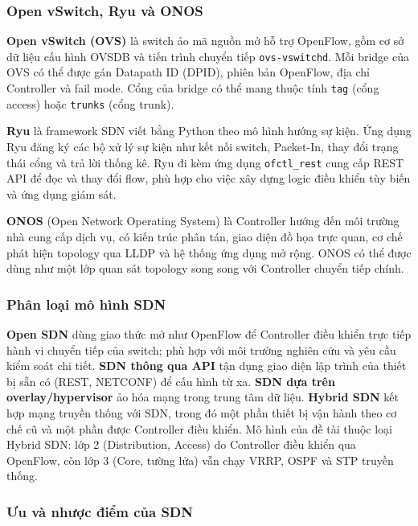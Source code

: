 \subsubsection{Open vSwitch, Ryu và ONOS}

\textbf{Open vSwitch (OVS)} là switch ảo mã nguồn mở hỗ trợ OpenFlow, gồm cơ sở dữ liệu cấu hình OVSDB và tiến trình chuyển tiếp \texttt{ovs-vswitchd}. Mỗi bridge của OVS có thể được gán Datapath ID (DPID), phiên bản OpenFlow, địa chỉ Controller và fail mode. Cổng của bridge có thể mang thuộc tính \texttt{tag} (cổng access) hoặc \texttt{trunks} (cổng trunk).

\textbf{Ryu} là framework SDN viết bằng Python theo mô hình hướng sự kiện. Ứng dụng Ryu đăng ký các bộ xử lý sự kiện như kết nối switch, Packet-In, thay đổi trạng thái cổng và trả lời thống kê. Ryu đi kèm ứng dụng \texttt{ofctl\_rest} cung cấp REST API để đọc và thay đổi flow, phù hợp cho việc xây dựng logic điều khiển tùy biến và ứng dụng giám sát.

\textbf{ONOS} (Open Network Operating System) là Controller hướng đến môi trường nhà cung cấp dịch vụ, có kiến trúc phân tán, giao diện đồ họa trực quan, cơ chế phát hiện topology qua LLDP và hệ thống ứng dụng mở rộng. ONOS có thể được dùng như một lớp quan sát topology song song với Controller chuyển tiếp chính.

\subsubsection{Phân loại mô hình SDN}

\textbf{Open SDN} dùng giao thức mở như OpenFlow để Controller điều khiển trực tiếp hành vi chuyển tiếp của switch; phù hợp với môi trường nghiên cứu và yêu cầu kiểm soát chi tiết. \textbf{SDN thông qua API} tận dụng giao diện lập trình của thiết bị sẵn có (REST, NETCONF) để cấu hình từ xa. \textbf{SDN dựa trên overlay/hypervisor} ảo hóa mạng trong trung tâm dữ liệu. \textbf{Hybrid SDN} kết hợp mạng truyền thống với SDN, trong đó một phần thiết bị vận hành theo cơ chế cũ và một phần được Controller điều khiển. Mô hình của đề tài thuộc loại Hybrid SDN: lớp 2 (Distribution, Access) do Controller điều khiển qua OpenFlow, còn lớp 3 (Core, tường lửa) vẫn chạy VRRP, OSPF và STP truyền thống.

\subsubsection{Ưu và nhược điểm của SDN}

